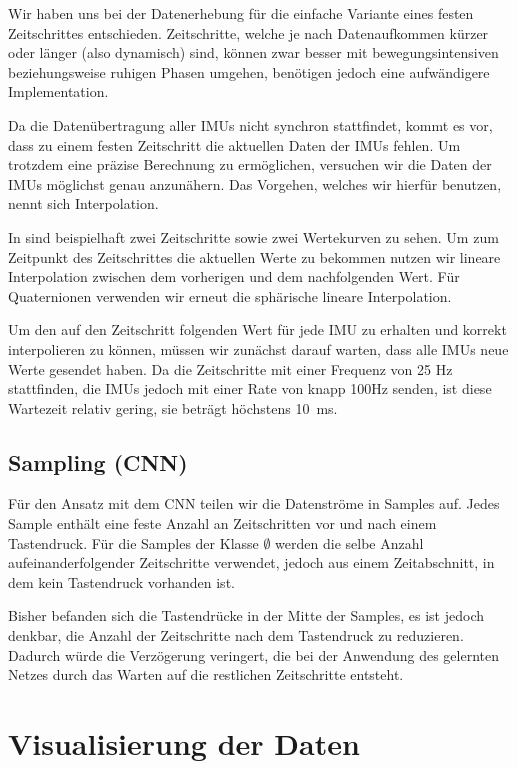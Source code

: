 Wir haben uns bei der Datenerhebung für die einfache Variante eines festen Zeitschrittes entschieden. Zeitschritte, welche je nach Datenaufkommen kürzer oder länger (also dynamisch) sind, können zwar besser mit bewegungsintensiven beziehungsweise ruhigen Phasen umgehen, benötigen jedoch eine aufwändigere Implementation.

Da die Datenübertragung aller IMUs nicht synchron stattfindet, kommt es vor, dass zu einem festen Zeitschritt die aktuellen Daten der IMUs fehlen. Um trotzdem eine präzise Berechnung zu ermöglichen, versuchen wir die Daten der IMUs möglichst genau anzunähern. Das Vorgehen, welches wir hierfür benutzen, nennt sich Interpolation.

In  sind beispielhaft zwei Zeitschritte sowie zwei Wertekurven zu sehen. Um zum Zeitpunkt des Zeitschrittes die aktuellen Werte zu bekommen nutzen wir lineare Interpolation zwischen dem vorherigen und dem nachfolgenden Wert. Für Quaternionen verwenden wir erneut die sphärische lineare Interpolation.

Um den auf den Zeitschritt folgenden Wert für jede IMU zu erhalten und korrekt interpolieren zu können, müssen wir zunächst darauf warten, dass alle IMUs neue Werte gesendet haben. Da die Zeitschritte mit einer Frequenz von 25 Hz stattfinden, die IMUs jedoch mit einer Rate von knapp 100Hz senden, ist diese Wartezeit relativ gering, sie beträgt höchstens \SI{10}{ms}.


\subsection{Sampling (CNN)}

Für den Ansatz mit dem CNN teilen wir die Datenströme in Samples auf. Jedes Sample enthält eine feste Anzahl an Zeitschritten vor und nach einem Tastendruck. Für die Samples der Klasse $\emptyset$ werden die selbe Anzahl aufeinanderfolgender Zeitschritte verwendet, jedoch aus einem Zeitabschnitt, in dem kein Tastendruck vorhanden ist.

Bisher befanden sich die Tastendrücke in der Mitte der Samples, es ist jedoch denkbar, die Anzahl der Zeitschritte nach dem Tastendruck zu reduzieren. Dadurch würde die Verzögerung veringert, die bei der Anwendung des gelernten Netzes durch das Warten auf die restlichen Zeitschritte entsteht.

\section{Visualisierung der Daten}

